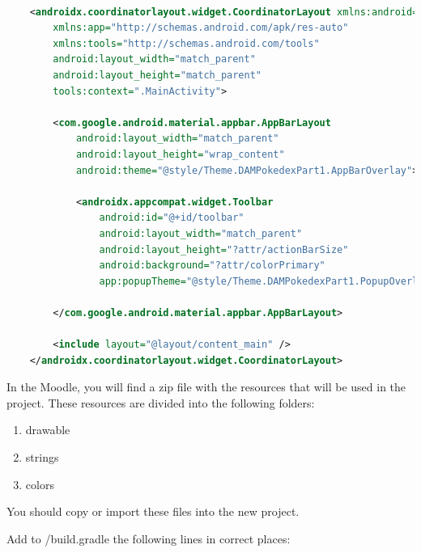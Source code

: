\documentclass[a4paper, 12pt]{article}
\begin{document}
\begin{enumerate}
    \begin{lstlisting}[caption={App Bar Code.}, label={layout:app_bar_main_code}, language=XML]

    <androidx.coordinatorlayout.widget.CoordinatorLayout xmlns:android="http://schemas.android.com/apk/res/android"
        xmlns:app="http://schemas.android.com/apk/res-auto"
        xmlns:tools="http://schemas.android.com/tools"
        android:layout_width="match_parent"
        android:layout_height="match_parent"
        tools:context=".MainActivity">
    
        <com.google.android.material.appbar.AppBarLayout
            android:layout_width="match_parent"
            android:layout_height="wrap_content"
            android:theme="@style/Theme.DAMPokedexPart1.AppBarOverlay">
    
            <androidx.appcompat.widget.Toolbar
                android:id="@+id/toolbar"
                android:layout_width="match_parent"
                android:layout_height="?attr/actionBarSize"
                android:background="?attr/colorPrimary"
                app:popupTheme="@style/Theme.DAMPokedexPart1.PopupOverlay" />
    
        </com.google.android.material.appbar.AppBarLayout>
    
        <include layout="@layout/content_main" />
    </androidx.coordinatorlayout.widget.CoordinatorLayout>

\end{lstlisting}

\end{enumerate}

In the Moodle, you will find a zip file with the resources that will be used in the project.
These resources are divided into the following folders:

\begin{enumerate}
    \item drawable
    \item strings
    \item colors
\end{enumerate}
You should copy or import these files into the new project.

Add to /build.gradle the following lines in correct places:
\end{document}
